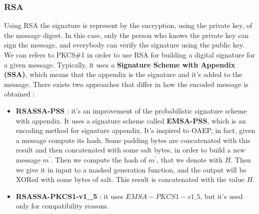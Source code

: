 \documentclass[11pt]{article}
\begin{document}
\subsubsection{RSA}
Using RSA the signature is represent by the encryption, using the private key, of the message digest. In this case, only the person who knows the private key can sign the message, and everybody can verify the signature using the public key. We can refers to PKCS\#1 in order to use RSA for building a digital signature for a given message. Typically, it uses a \textbf{Signature Scheme with Appendix (SSA)}, which means that the appendix is the signature and it's added to the message. There exists two approaches that differ in how the encoded message is obtained :
\begin{itemize}
\item \textbf{RSASSA-PSS} : it's an improvement of the probabilistic signature scheme with appendix. It uses a signature scheme called \textbf{EMSA-PSS}, which is an encoding method for signature appendix. It's inspired to OAEP, in fact, given a message compute its hash. Some padding bytes are concatenated with this result and then concatenated with some salt bytes, in order to build a new message $m^{'}$. Then we compute the hash of $m^{'}$, that we denote with $H$. Then we give it in input to a masked generation function, and the output will be XORed with some bytes of salt. This result is concatenated with the value $H$.
\item \textbf{RSASSA-PKCS1-v1\_5} : it uses $EMSA-PKCS1-v1\_5$, but it's used only for compatibility reasons.
\end{itemize}
\end{document}
